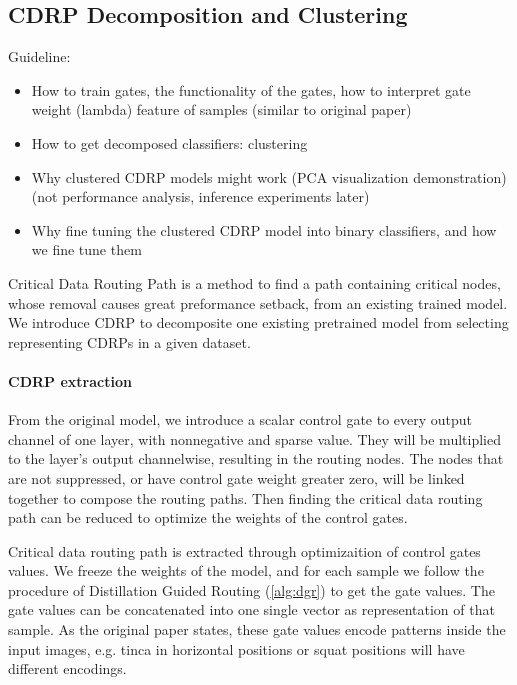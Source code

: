 \documentclass[sigplan,10pt,review]{acmart}\settopmatter{printfolios=true,printccs=false,printacmref=false}
\begin{document}
\subsection{CDRP Decomposition and Clustering}
Guideline:
\begin{itemize}
	\item How to train gates, the functionality of the gates, how to interpret gate weight (lambda) feature of samples (similar to original paper)
	\item How to get decomposed classifiers: clustering
	\item Why clustered CDRP models might work (PCA visualization demonstration) (not performance analysis, inference experiments later)
	\item Why fine tuning the clustered CDRP model into binary classifiers, and how we fine tune them
\end{itemize}

Critical Data Routing Path is a method to find a path containing critical nodes, whose removal causes great preformance setback, from an existing trained model. We introduce CDRP to decomposite one existing pretrained model from selecting representing CDRPs in a given dataset.

\paragraph{CDRP extraction}

From the original model, we introduce a scalar control gate to every output channel of one layer, with nonnegative and sparse value. They will be multiplied to the layer’s output channelwise, resulting in the routing nodes. The nodes that are not suppressed, or have control gate weight greater zero, will be linked together to compose the routing paths. Then finding the critical data routing path can be reduced to optimize the weights of the control gates.

Critical data routing path is extracted through optimizaition of control gates values. We freeze the weights of the model, and for each sample we follow the procedure of Distillation Guided Routing (\cref{alg:dgr}) \cite{wang2018interpret} to get the gate values. The gate values can be concatenated into one single vector as representation of that sample. As the original paper \cite{wang2018interpret} states, these gate values encode patterns inside the input images, e.g. tinca in horizontal positions or squat positions will have different encodings.
\end{document}
